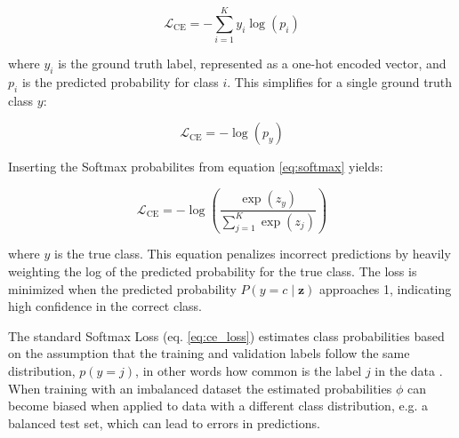 \begin{equation}
    \label{eq:ce_multi}
    \mathcal{L}_{\text{CE}} = -\sum_{i=1}^{K} y_i \log(p_i)
\end{equation}

\noindent where $y_i$ is the ground truth label, represented as a one-hot encoded vector, and $p_i$ is the predicted probability for class $i$. This simplifies for a single ground truth class $y$:

\begin{equation}
    \label{eq:ce_single}
    \mathcal{L}_{\text{CE}} = - \log(p_y)
\end{equation}

\noindent Inserting the Softmax probabilites from equation \eqref{eq:softmax} yields:

\begin{equation}
    \label{eq:ce_loss}
    \mathcal{L}_{\text{CE}} = - \log\left(\frac{\exp(z_y)}{\sum_{j=1}^{K} \exp(z_j)}\right)
\end{equation}

\noindent where $y$ is the true class. This equation penalizes incorrect predictions by heavily weighting the log of the predicted probability for the true class. The loss is minimized when the predicted probability \( P(y = c \mid \mathbf{z}) \) approaches 1, indicating high confidence in the correct class.

The standard Softmax Loss (eq. \eqref{eq:ce_loss}) estimates class probabilities based on the assumption that the training and validation labels follow the same distribution, $p(y=j)$, in other words how common is the label $j$ in the data \cite{ren2020balancedmetasoftmaxlongtailedvisual}. When training with an imbalanced dataset the estimated probabilities $\phi$ can become biased when applied to data with a different class distribution, e.g. a balanced test set, which can lead to errors in predictions.


